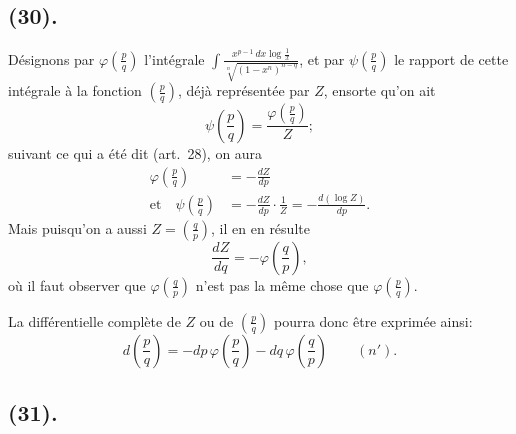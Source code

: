\documentclass{article}
\begin{document}
\subsection*{(30).}

Désignons par $\varphi\left(\frac{p}{q}\right)$ l'intégrale $\displaystyle\int\frac{x^{p-1}\,dx\log\frac{1}{x}}{\sqrt[n]{(1-x^{n})^{n-q}}}$, et par $\psi\left(\frac{p}{q}\right)$ le rapport de cette intégrale à la fonction $\left(\frac{p}{q}\right)$, déjà représentée par $Z$, ensorte qu'on ait
\[ \psi\left(\frac{p}{q}\right)=\frac{\varphi\left(\frac{p}{q}\right)}{Z}; \]
suivant ce qui a été dit (art.~28), on aura
\[ \begin{aligned} \varphi\left(\frac{p}{q}\right)&=-\frac{dZ}{dp}\\ \text{et}\quad\psi\left(\frac{p}{q}\right)&=-\frac{dZ}{dp}\cdot\frac{1}{Z}=-\frac{d(\log Z)}{dp}. \end{aligned} \]
Mais puisqu'on a aussi $Z=\left(\frac{q}{p}\right)$, il en en résulte
\[ \frac{dZ}{dq}=-\varphi\left(\frac{q}{p}\right), \]
où il faut observer que $\varphi\left(\frac{q}{p}\right)$ n'est pas la même chose que $\varphi\left(\frac{p}{q}\right)$.


La différentielle complète de $Z$ ou de $\left(\frac{p}{q}\right)$ pourra donc être exprimée ainsi:
\[ d\left(\frac{p}{q}\right)=-dp\,\varphi\left(\frac{p}{q}\right)-dq\,\varphi\left(\frac{q}{p}\right)\qquad(n'). \]

\subsection*{(31).}
\end{document}

